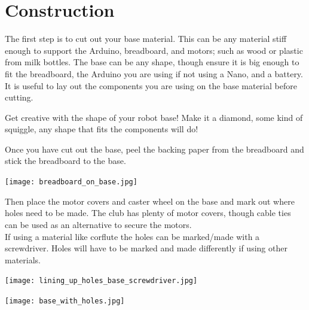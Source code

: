 \documentclass[../TinyBot.tex]{subfiles}
\begin{document}
\section{Construction} \label{sec:construction}

The first step is to cut out your base material. This can be any material stiff enough to support the Arduino, breadboard, and motors; such as wood or plastic from milk bottles. The base can be any shape, though ensure it is big enough to fit the breadboard, the Arduino you are using if not using a Nano, and a battery.
It is useful to lay out the components you are using on the base material before cutting. \\

\begin{notebox}
    Get creative with the shape of your robot base! Make it a diamond, some kind of squiggle, any shape that fits the components will do!    
\end{notebox}

Once you have cut out the base, peel the backing paper from the breadboard and stick the breadboard to the base.
\begin{center}
    \texttt{[image: breadboard\_on\_base.jpg]}
\end{center}

Then place the motor covers and caster wheel on the base and mark out where holes need to be made. The club has plenty of motor covers, though cable ties can be used as an alternative to secure the motors. \\
If using a material like corflute the holes can be marked/made with a screwdriver. Holes will have to be marked and made differently if using other materials. 

\begin{minipage}[t]{0.475\textwidth} \vspace{0pt}
    \begin{center}
        \texttt{[image: lining\_up\_holes\_base\_screwdriver.jpg]}
    \end{center}
\end{minipage}\hfill
\begin{minipage}[t]{0.475\textwidth} \vspace{0pt}
    \begin{center}
        \texttt{[image: base\_with\_holes.jpg]}
    \end{center}
\end{minipage}
\end{document}
